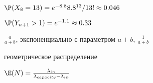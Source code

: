 \begin{solution}{6.11}
\end{solution}
\begin{solution}{6.12}
\end{solution}
\begin{solution}{6.13}
\end{solution}
\begin{solution}{6.14}
\end{solution}
\begin{solution}{6.15}
\end{solution}
\begin{solution}{6.16}
\end{solution}
\begin{solution}{6.17}
\end{solution}
\begin{solution}{6.18}
\end{solution}
\begin{solution}{6.19}
\end{solution}
\begin{solution}{6.20}
\end{solution}
\begin{solution}{6.21}
\end{solution}
\begin{solution}{6.22}
\end{solution}
\begin{solution}{6.23}
\end{solution}
\begin{solution}{6.24}
\end{solution}
\begin{solution}{7.1}
  $\P(X_8=13)=e^{-8.8}8.8^{13}/13!\approx 0.046$

  $\P(Y_{n+1}>1)=e^{-1.1}\approx 0.33$
\end{solution}
\begin{solution}{7.2}
\end{solution}
\begin{solution}{7.3}
\end{solution}
\begin{solution}{7.4}
\end{solution}
\begin{solution}{7.5}
$\frac{a}{a+b}$, экспоненциально с параметром $a+b$, $\frac{1}{a+b}$
\end{solution}
\begin{solution}{7.6}
  геометрическое распределение

  $\E(N)=\frac{\lambda_{in}}{\lambda_{capacity}-\lambda_{in}}$
\end{solution}
